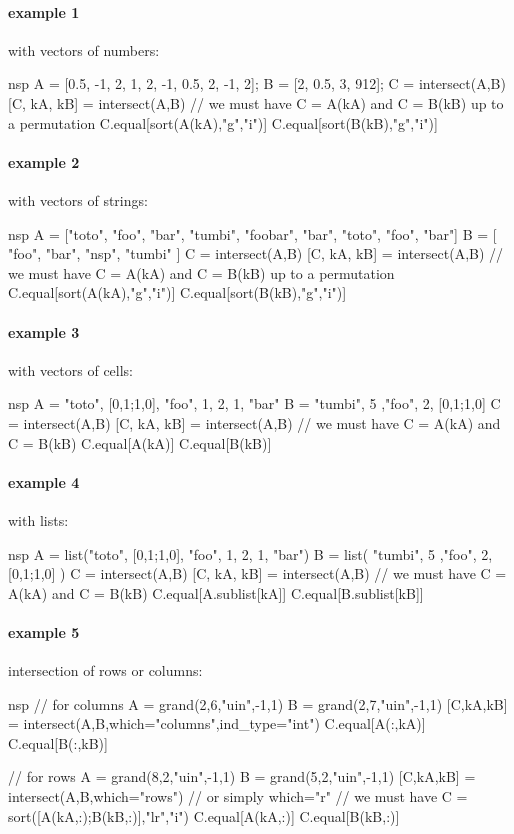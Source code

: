 \begin{examples}

\paragraph{example 1} with vectors of numbers:
\begin{mintednsp}{nsp}
A = [0.5, -1, 2, 1, 2, -1, 0.5, 2, -1, 2];
B = [2, 0.5, 3, 912];
C = intersect(A,B)
[C, kA, kB] = intersect(A,B)
// we must have C = A(kA) and C = B(kB) up to a permutation
C.equal[sort(A(kA),"g","i")]
C.equal[sort(B(kB),"g","i")]
\end{mintednsp}

\paragraph{example 2} with vectors of strings:
\begin{mintednsp}{nsp}
A = ["toto", "foo", "bar", "tumbi", "foobar", "bar", "toto", "foo", "bar"]
B = [ "foo", "bar", "nsp", "tumbi" ]
C = intersect(A,B)
[C, kA, kB] = intersect(A,B)
// we must have C = A(kA) and C = B(kB) up to a permutation
C.equal[sort(A(kA),"g","i")]
C.equal[sort(B(kB),"g","i")]
\end{mintednsp}

\paragraph{example 3} with vectors of cells:
  \begin{mintednsp}{nsp}
A = {"toto", [0,1;1,0], "foo", 1, 2, 1, "bar"}
B = {  "tumbi", 5 ,"foo", 2,  [0,1;1,0] }
C = intersect(A,B)
[C, kA, kB] = intersect(A,B)
// we must have C = A(kA) and C = B(kB)
C.equal[A(kA)]
C.equal[B(kB)]
  \end{mintednsp}

\paragraph{example 4} with lists:
\begin{mintednsp}{nsp}
A = list("toto", [0,1;1,0], "foo", 1, 2, 1, "bar")
B = list(  "tumbi", 5 ,"foo", 2,  [0,1;1,0] )
C = intersect(A,B)
[C, kA, kB] = intersect(A,B)
// we must have C = A(kA) and C = B(kB)
C.equal[A.sublist[kA]]
C.equal[B.sublist[kB]]
\end{mintednsp}


\paragraph{example 5} intersection of rows or columns:
\begin{mintednsp}{nsp}
// for columns
A = grand(2,6,"uin",-1,1)
B = grand(2,7,"uin",-1,1)
[C,kA,kB] = intersect(A,B,which="columns",ind_type="int")
C.equal[A(:,kA)]
C.equal[B(:,kB)]

// for rows
A = grand(8,2,"uin",-1,1)
B = grand(5,2,"uin",-1,1)
[C,kA,kB] = intersect(A,B,which="rows")  // or simply which="r"
// we must have C = sort([A(kA,:);B(kB,:)],"lr","i")
C.equal[A(kA,:)]
C.equal[B(kB,:)]
\end{mintednsp}

\end{examples}

